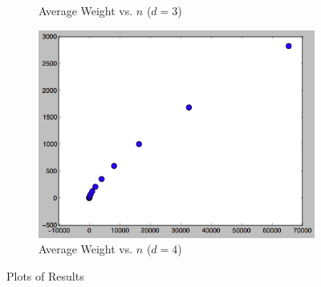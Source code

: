 \documentclass[12pt]{article}
\begin{document}
\begin{figure}
\begin{subfigure}{.5\textwidth}
  \caption{Average Weight vs. $n$ ($d = 3$)}
  \label{fig:sub3}
\end{subfigure}%
\begin{subfigure}{.5\textwidth}
  \centering
  \includegraphics[width=0.8\linewidth]{img/result4.png}
  \caption{Average Weight vs. $n$ ($d = 4$)}
  \label{fig:sub4}
\end{subfigure}%
\caption{Plots of Results}
\end{figure}
\end{document}
